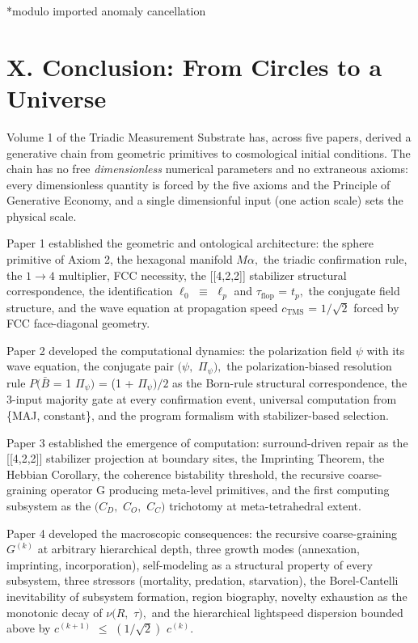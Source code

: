 \documentclass[11pt,oneside]{report}
\theoremstyle{definition}
\theoremstyle{remark}
\begin{document}
*modulo imported anomaly cancellation

\section*{X. Conclusion: From Circles to a Universe}

Volume 1 of the Triadic Measurement Substrate has, across five papers,
derived a generative chain from geometric primitives to cosmological
initial conditions. The chain has no free \emph{dimensionless} numerical
parameters and no extraneous axioms: every dimensionless quantity is
forced by the five axioms and the Principle of Generative Economy, and a
single dimensionful input (one action scale) sets the physical scale.

Paper 1 established the geometric and ontological architecture: the
sphere primitive of Axiom 2, the hexagonal manifold \ensuremath{M\alpha ,} the triadic
confirmation rule, the \ensuremath{1\to 4} multiplier, FCC necessity, the
[[4,2,2]] stabilizer structural correspondence, the
identification \ensuremath{\ell_{0}} \ensuremath{\equiv} \ensuremath{\ell_{p}} and \ensuremath{\tau_{\mathrm{flop}}} = \ensuremath{t_{p},} the conjugate field structure,
and the wave equation at propagation speed \ensuremath{c_{\mathrm{TMS}}} = \ensuremath{1/\sqrt{2}} forced by FCC
face-diagonal geometry.

Paper 2 developed the computational dynamics: the polarization field \ensuremath{\psi}
with its wave equation, the conjugate pair \ensuremath{(\psi ,} \ensuremath{\Pi_{\psi}),} the
polarization-biased resolution rule \ensuremath{P(\bar{B}} = 1 \textbar{} \ensuremath{\Pi_{\psi})} = (1 +
\ensuremath{\Pi_{\psi})/2} as the Born-rule structural correspondence, the 3-input majority
gate at every confirmation event, universal computation from \{MAJ,
constant\}, and the program formalism with stabilizer-based selection.

Paper 3 established the emergence of computation: surround-driven repair
as the [[4,2,2]] stabilizer projection at boundary sites, the
Imprinting Theorem, the Hebbian Corollary, the coherence bistability
threshold, the recursive coarse-graining operator G producing meta-level
primitives, and the first computing subsystem as the \ensuremath{(C_{D},} \ensuremath{C_{O},} \ensuremath{C_{C})}
trichotomy at meta-tetrahedral extent.

Paper 4 developed the macroscopic consequences: the recursive
coarse-graining \ensuremath{G^{(k)}} at arbitrary hierarchical depth, three growth
modes (annexation, imprinting, incorporation), self-modeling as a
structural property of every subsystem, three stressors (mortality,
predation, starvation), the Borel-Cantelli inevitability of subsystem
formation, region biography, novelty exhaustion as the monotonic decay
of \ensuremath{\nu (R,} \ensuremath{\tau ),} and the hierarchical lightspeed dispersion bounded above by
\ensuremath{c^{(k+1)}} \ensuremath{\leq} \ensuremath{(1/\sqrt{2})} \ensuremath{c^{(k)}.}
\end{document}
